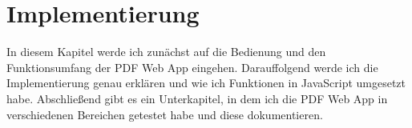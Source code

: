 \chapter{Implementierung}
In diesem Kapitel werde ich zunächst auf die Bedienung und den Funktionsumfang der PDF Web App eingehen. Darauffolgend werde ich die Implementierung genau erklären und wie ich Funktionen in JavaScript umgesetzt habe. Abschließend gibt es ein Unterkapitel, in dem ich die PDF Web App in verschiedenen Bereichen getestet habe und diese dokumentieren.



